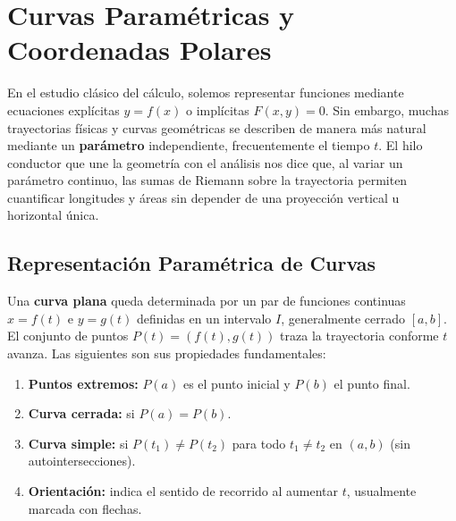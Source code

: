 
\chapter{Curvas Paramétricas y Coordenadas Polares}
En el estudio clásico del cálculo, solemos representar funciones mediante
ecuaciones explícitas $y = f(x)$ o implícitas $F(x,y) = 0$. Sin embargo,
muchas trayectorias físicas y curvas geométricas se describen de manera más
natural mediante un \textbf{parámetro} independiente, frecuentemente el
tiempo $t$. El hilo conductor que une la geometría con el análisis
nos dice que, al variar un parámetro continuo, las sumas de Riemann sobre la
trayectoria permiten cuantificar longitudes y áreas sin depender de una
proyección vertical u horizontal única.
\section{Representación Paramétrica de Curvas}



\begin{definition}
Una \textbf{curva plana} queda determinada por un par de funciones continuas
$x = f(t)$ e $y = g(t)$ definidas en un intervalo $I$, generalmente cerrado
$[a, b]$. El conjunto de puntos $P(t) = (f(t), g(t))$ traza la trayectoria
conforme $t$ avanza. Las siguientes son sus propiedades fundamentales:
\begin{enumerate} 
  \item \textbf{Puntos extremos:} $P(a)$ es el punto inicial y $P(b)$ el punto final.
  \item \textbf{Curva cerrada:} si $P(a) = P(b)$.
  \item \textbf{Curva simple:} si $P(t_1) \neq P(t_2)$ para todo $t_1 \neq t_2$
        en $(a,b)$ (sin autointersecciones).
  \item \textbf{Orientación:} indica el sentido de recorrido al aumentar $t$,
        usualmente marcada con flechas.
\end{enumerate}
\end{definition}

